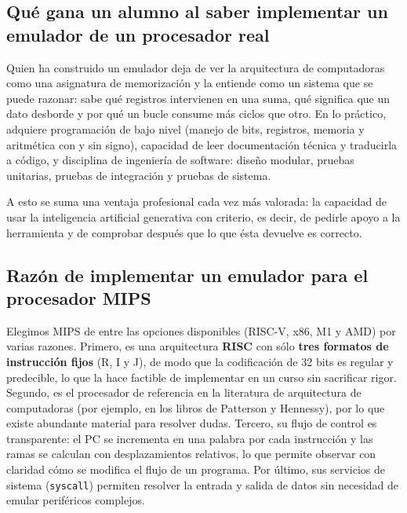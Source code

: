 \documentclass[11pt,letterpaper,oneside]{article}
\begin{document}
\subsection{Qué gana un alumno al saber implementar un emulador de un procesador real}

Quien ha construido un emulador deja de ver la arquitectura de computadoras
como una asignatura de memorización y la entiende como un sistema que se puede
razonar: sabe qué registros intervienen en una suma, qué significa que un dato
desborde y por qué un bucle consume más ciclos que otro. En lo práctico,
adquiere programación de bajo nivel (manejo de bits, registros, memoria y
aritmética con y sin signo), capacidad de leer documentación técnica y
traducirla a código, y disciplina de ingeniería de software: diseño modular,
pruebas unitarias, pruebas de integración y pruebas de sistema.

A esto se suma una ventaja profesional cada vez más valorada: la capacidad de
usar la inteligencia artificial generativa con criterio, es decir, de pedirle
apoyo a la herramienta y de comprobar después que lo que ésta devuelve es
correcto.

\subsection{Razón de implementar un emulador para el procesador MIPS}

Elegimos MIPS de entre las opciones disponibles (RISC-V, x86, M1 y AMD) por
varias razones. Primero, es una arquitectura \textbf{RISC} con sólo \textbf{tres
formatos de instrucción fijos} (R, I y J), de modo que la codificación de 32
bits es regular y predecible, lo que la hace factible de implementar en un curso
sin sacrificar rigor. Segundo, es el procesador de referencia en la literatura
de arquitectura de computadoras (por ejemplo, en los libros de Patterson y
Hennessy), por lo que existe abundante material para resolver dudas. Tercero, su
flujo de control es transparente: el PC se incrementa en una palabra por cada
instrucción y las ramas se calculan con desplazamientos relativos, lo que permite
observar con claridad cómo se modifica el flujo de un programa. Por último, sus
servicios de sistema (\texttt{syscall}) permiten resolver la entrada y salida de
datos sin necesidad de emular periféricos complejos.

\end{document}
